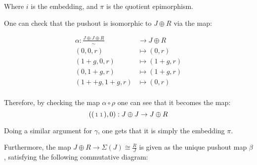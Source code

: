 Where \( i \) is the embedding, and \( \pi \) is the quotient epimorphism.

One can check that the pushout is isomorphic to \( J \oplus R \) via the map:

\begin{align*}
	\alpha: \frac{J \oplus J \oplus R}{\sim} &\to J \oplus R \\
	(0, 0, r) &\mapsto (0, r) \\
	(1 + g, 0, r) &\mapsto (1 + g, r) \\
	(0, 1 + g, r) &\mapsto (1 + g, r) \\
	(1+ + g, 1 + g, r) &\mapsto (0, r) \\
\end{align*}

Therefore, by checking the map \( \alpha \circ \rho \) one can see that it becomes the map:
\[ 
	(\begin{psmallmatrix}
		1 & 1 \\
	\end{psmallmatrix}, 0):  J \oplus J \to J \oplus R
\]

Doing a similar argument for \( \gamma \), one gets that it is simply the embedding \( \pi \).

Furthermore, the map \( J \oplus R \to \Sigma(J) \cong \frac{R}{J} \) is given as the unique pushout map \( \beta \), satisfying the following commutative diagram:

\begin{center}
\end{center}

